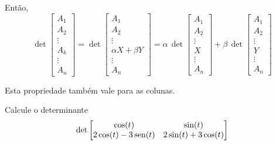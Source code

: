 \begin{frame}[label=determinantes]
Então, 
\[\det\begin{bmatrix}
A_1 \\ A_2 \\ \vdots\\ A_k \\ \vdots \\ A_n
\end{bmatrix}
=\det\begin{bmatrix}
A_1 \\ A_2 \\ \vdots\\ \alpha X+\beta Y\\ \vdots \\ A_n
\end{bmatrix}=\alpha\, \det\begin{bmatrix}
A_1 \\ A_2 \\ \vdots\\ X \\ \vdots \\ A_n
\end{bmatrix}+\beta\, \det\begin{bmatrix}
A_1 \\ A_2 \\ \vdots\\ Y\\ \vdots \\ A_n
\end{bmatrix}\]

 Esta propriedade também vale para as colunas.

\end{frame}

\begin{frame}[label=determinantes]


\begin{exe} Calcule o determinante
\[\det\begin{bmatrix}
\cos(t) & \sin(t)\\
2\cos(t)-3\operatorname{sen}(t) & 2\sin(t)+3\cos(t)
\end{bmatrix}
\]

\end{exe}
\end{frame}

